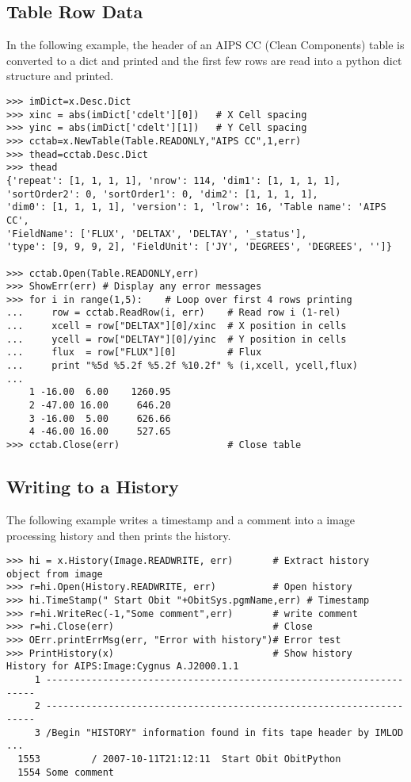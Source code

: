 \documentclass[11pt]{report}
\begin{document}
\subsection{Table Row Data}
In the following example, the header of an AIPS CC (Clean Components) 
table is converted to a dict and printed and the first few rows 
are read into a python dict structure and printed.
\begin{verbatim}
>>> imDict=x.Desc.Dict
>>> xinc = abs(imDict['cdelt'][0])   # X Cell spacing
>>> yinc = abs(imDict['cdelt'][1])   # Y Cell spacing
>>> cctab=x.NewTable(Table.READONLY,"AIPS CC",1,err)
>>> thead=cctab.Desc.Dict
>>> thead
{'repeat': [1, 1, 1, 1], 'nrow': 114, 'dim1': [1, 1, 1, 1],
'sortOrder2': 0, 'sortOrder1': 0, 'dim2': [1, 1, 1, 1], 
'dim0': [1, 1, 1, 1], 'version': 1, 'lrow': 16, 'Table name': 'AIPS CC', 
'FieldName': ['FLUX', 'DELTAX', 'DELTAY', '_status'], 
'type': [9, 9, 9, 2], 'FieldUnit': ['JY', 'DEGREES', 'DEGREES', '']}

>>> cctab.Open(Table.READONLY,err)
>>> ShowErr(err) # Display any error messages
>>> for i in range(1,5):    # Loop over first 4 rows printing
...     row = cctab.ReadRow(i, err)    # Read row i (1-rel)
...     xcell = row["DELTAX"][0]/xinc  # X position in cells
...     ycell = row["DELTAY"][0]/yinc  # Y position in cells
...     flux  = row["FLUX"][0]         # Flux
...     print "%5d %5.2f %5.2f %10.2f" % (i,xcell, ycell,flux)
... 
    1 -16.00  6.00    1260.95
    2 -47.00 16.00     646.20
    3 -16.00  5.00     626.66
    4 -46.00 16.00     527.65
>>> cctab.Close(err)                   # Close table

\end{verbatim}

\subsection{Writing to a History}
The following example writes a timestamp and a comment into a image
processing history and then prints the history.
\begin{verbatim}
>>> hi = x.History(Image.READWRITE, err)       # Extract history object from image
>>> r=hi.Open(History.READWRITE, err)          # Open history
>>> hi.TimeStamp(" Start Obit "+ObitSys.pgmName,err) # Timestamp
>>> r=hi.WriteRec(-1,"Some comment",err)       # write comment
>>> r=hi.Close(err)                            # Close
>>> OErr.printErrMsg(err, "Error with history")# Error test
>>> PrintHistory(x)                            # Show history
History for AIPS:Image:Cygnus A.J2000.1.1
     1 --------------------------------------------------------------------  
     2 --------------------------------------------------------------------  
     3 /Begin "HISTORY" information found in fits tape header by IMLOD       
...
  1553         / 2007-10-11T21:12:11  Start Obit ObitPython
  1554 Some comment
\end{verbatim}
\end{document}
